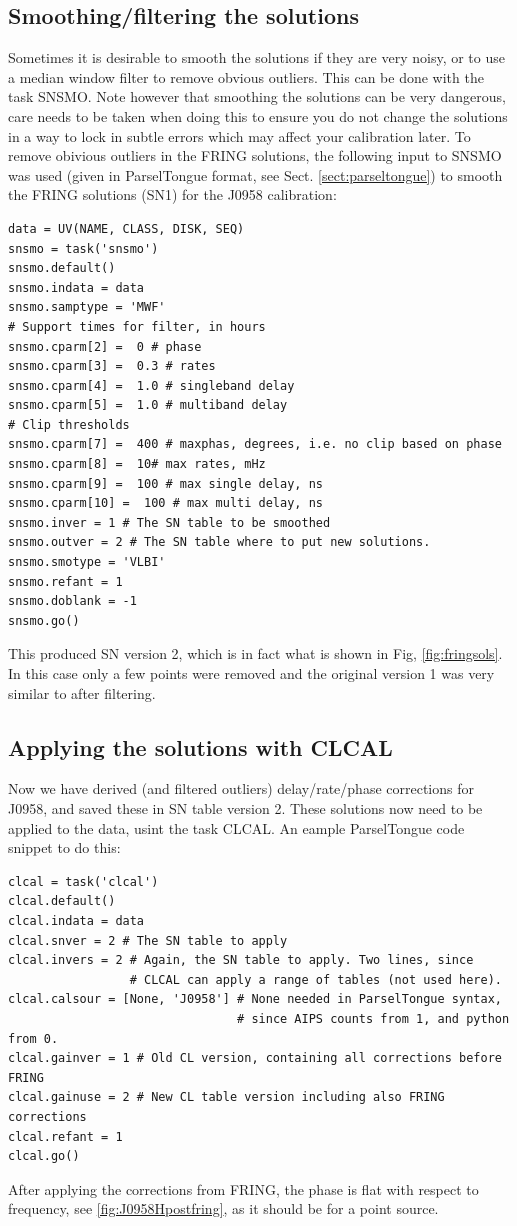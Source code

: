 \subsection{Smoothing/filtering the solutions}
Sometimes it is desirable to smooth the solutions if they are very noisy, or to
use a median window filter to remove obvious outliers. This can be done with
the task SNSMO. Note however that smoothing the solutions can be very
dangerous, care needs to be taken when doing this to ensure you do not change
the solutions in a way to lock in subtle errors which may affect your
calibration later. 
To remove obivious outliers in the FRING solutions, the following
input to SNSMO was used (given in ParselTongue format, see Sect. \ref{sect:parseltongue})
to smooth the FRING solutions (SN1) for the J0958 calibration:
\begin{lstlisting}
data = UV(NAME, CLASS, DISK, SEQ)
snsmo = task('snsmo')
snsmo.default()
snsmo.indata = data
snsmo.samptype = 'MWF'
# Support times for filter, in hours
snsmo.cparm[2] =  0 # phase
snsmo.cparm[3] =  0.3 # rates
snsmo.cparm[4] =  1.0 # singleband delay
snsmo.cparm[5] =  1.0 # multiband delay
# Clip thresholds
snsmo.cparm[7] =  400 # maxphas, degrees, i.e. no clip based on phase
snsmo.cparm[8] =  10# max rates, mHz
snsmo.cparm[9] =  100 # max single delay, ns
snsmo.cparm[10] =  100 # max multi delay, ns
snsmo.inver = 1 # The SN table to be smoothed
snsmo.outver = 2 # The SN table where to put new solutions.
snsmo.smotype = 'VLBI'
snsmo.refant = 1
snsmo.doblank = -1
snsmo.go()
\end{lstlisting}
This produced SN version 2, which is in fact what is shown in Fig,
\ref{fig:fringsols}. In this case only a few points were removed and the
original version 1 was very similar to after filtering. 

\subsection{Applying the solutions with CLCAL}
Now we have derived (and filtered outliers) delay/rate/phase corrections for J0958, and
saved these in SN table version 2. These solutions now need to be applied to the data,
usint the task CLCAL. An eample ParselTongue code snippet to do this:
\begin{lstlisting}
clcal = task('clcal')
clcal.default()
clcal.indata = data
clcal.snver = 2 # The SN table to apply
clcal.invers = 2 # Again, the SN table to apply. Two lines, since 
                 # CLCAL can apply a range of tables (not used here).
clcal.calsour = [None, 'J0958'] # None needed in ParselTongue syntax, 
                                # since AIPS counts from 1, and python from 0.
clcal.gainver = 1 # Old CL version, containing all corrections before FRING
clcal.gainuse = 2 # New CL table version including also FRING corrections
clcal.refant = 1
clcal.go()
\end{lstlisting}
After applying the corrections from FRING, the phase is flat with respect to
frequency, see \ref{fig:J0958Hpostfring}, as it should be for a point
source.

